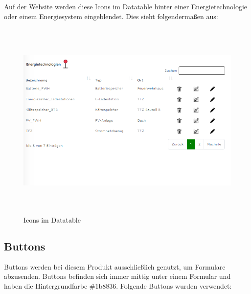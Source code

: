 Auf der Website werden diese Icons im Datatable hinter einer Energietechnologie oder einem Energiesystem eingeblendet. Dies sieht folgendermaßen aus:
\begin{figure}[h]
	\centering
	\includegraphics[height=10cm,width=15cm]{images/IconsImDatatable}
	\caption{Icons im Datatable}
	\label{fig: Icons im Datatable}
\end{figure}


\subsection{Buttons}
Buttons werden bei diesem Produkt ausschließlich genutzt, um Formulare abzusenden. Buttons befinden sich immer mittig unter einem Formular und  haben die Hintergrundfarbe \#1b8836. Folgende Buttons wurden verwendet: 

